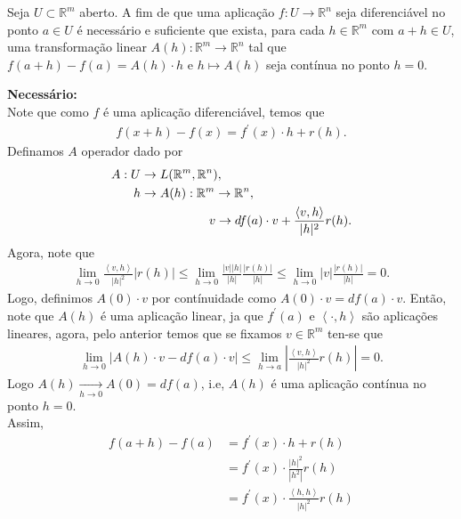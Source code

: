 \begin{homeworkProblem}[Seção 1-4]
  Seja $U \subset \mathbb{R}^m$ aberto. A fim de que uma aplicação $f : U \to \mathbb{R}^n$ seja diferenciável no ponto $a \in U$ é necessário e suficiente que exista, para cada $h \in \mathbb{R}^m$ com $a+h \in U$, uma transformação linear $A(h):\mathbb{R}^m \to \mathbb{R}^n$ tal que $f(a+h)-f(a)=A(h)\cdot h$ e $h \mapsto A(h)$ seja contínua no ponto $h=0$.
  \begin{solution}
  \textbf{Necessário:}\\
    Note que como $f$ é uma aplicação diferenciável, temos que
    \begin{align*}
      f(x+h)-f(x)=f^{\prime}(x)\cdot h+r(h).
    \end{align*}
    Definamos $A$ operador dado por
    \begin{align*}
      A:U&\to L(\mathbb{R}^{m},\mathbb{R}^{n}),\\
      h&\to A(h):\mathbb{R}^{m}\to\mathbb{R}^{n},\\
      \phantom{h}&\phantom{\to A(h):}\hspace{0.55cm}v\to df(a)\cdot v+\frac{\left\langle v,h \right\rangle}{|h|^{2}}r(h).
    \end{align*}
    Agora, note que
    \begin{align*}
      \lim_{h \to 0}\frac{\left\langle v,h \right\rangle}{|h|^{2}}|r(h)|\leq \lim_{h \to 0}\frac{|v||h|}{|h|}\frac{|r(h)|}{|h|}\leq \lim_{h \to 0}|v|\frac{|r(h)|}{|h|}=0.
    \end{align*}
    Logo, definimos $A(0)\cdot v$ por contínuidade como $A(0)\cdot v=df(a)\cdot v$. Então, note que $A(h)$ é uma aplicação linear, ja que $f^{\prime}(a)$ e $\left\langle \cdot,h \right\rangle$ são aplicações lineares, agora, pelo anterior temos que se fixamos $v\in\mathbb{R}^{m}$ ten-se que 
    \begin{align*}
      \lim_{h \to 0}|A(h)\cdot v-df(a)\cdot v|\leq \lim_{h \to a}\left| \frac{\left\langle v,h \right\rangle}{|h|^{2}}r(h) \right|=0.
    \end{align*}
    Logo $A(h)\xrightarrow[h\to 0]{}A(0)=df(a)$, i.e, $A(h)$ é uma aplicação contínua no ponto $h=0$.\\
    Assim,
    \begin{align*}
      f(a+h)-f(a)&= f^{\prime}(x)\cdot h + r(h)\\
      &=f^{\prime}(x)\cdot \frac{|h|^{2}}{|h^{2}|}r(h)\\
      &=f^{\prime}(x)\cdot \frac{\left\langle h,h \right\rangle}{|h|^{2}}r(h)\\

\end{align*}
\end{solution}
\end{homeworkProblem}
